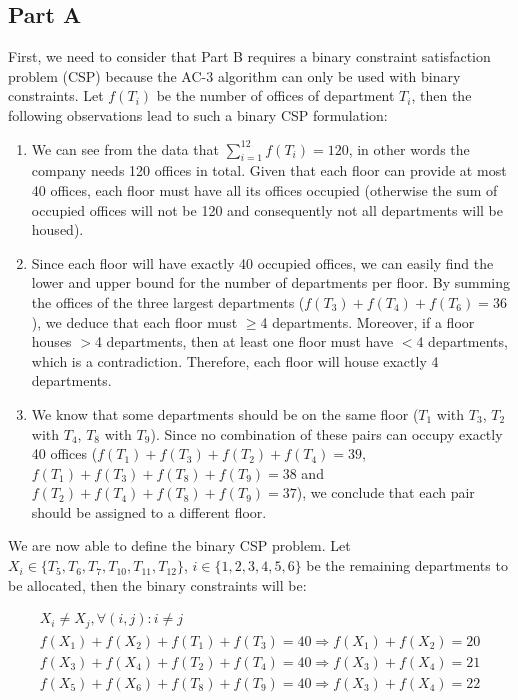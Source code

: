 \subsection*{Part A}

First, we need to consider that Part B requires a binary constraint satisfaction problem (CSP) because the AC-3 algorithm can only be used with binary constraints. Let $f(T_i)$ be the number of offices of department $T_i$, then the following observations lead to such a binary CSP formulation:

\begin{enumerate}

\item We can see from the data that $\sum_{i=1}^{12} f(T_i)=120$, in other words the company needs 120 offices in total. Given that each floor can provide at most 40 offices, each floor must have all its offices occupied (otherwise the sum of occupied offices will not be 120 and consequently not all departments will be housed).

\item Since each floor will have exactly 40 occupied offices, we can easily find the lower and upper bound for the number of departments per floor. By summing the offices of the three largest departments ($f(T_3)+f(T_4)+f(T_6)=36$), we deduce that each floor must $\ge$4 departments. Moreover, if a floor houses $>$4 departments, then at least one floor must have $<$4 departments, which is a contradiction. Therefore, each floor will house exactly 4 departments.

\item We know that some departments should be on the same floor ($T_1$ with $T_3$, $T_2$ with $T_4$, $T_8$ with $T_9$). Since no combination of these pairs can occupy exactly 40 offices ($f(T_1)+f(T_3)+f(T_2)+f(T_4) = 39$, $f(T_1)+f(T_3)+f(T_8)+f(T_9) = 38$ and $f(T_2)+f(T_4)+f(T_8)+f(T_9) = 37$), we conclude that each pair should be assigned to a different floor.

\end{enumerate}

We are now able to define the binary CSP problem. Let $X_i \in \{T_5, T_6, T_7, T_{10}, T_{11}, T_{12}\}$, $i \in \{1, 2, 3, 4, 5, 6\}$ be the remaining departments to be allocated, then the binary constraints will be:

\[
	\begin{array}{ll}
		X_i \ne X_j, \forall (i,j) : i \ne j \\
		f(X_1) + f(X_2) + f(T_1) + f(T_3) = 40 \Rightarrow f(X_1) + f(X_2) = 20 \\
		f(X_3) + f(X_4) + f(T_2) + f(T_4) = 40 \Rightarrow f(X_3) + f(X_4) = 21 \\
		f(X_5) + f(X_6) + f(T_8) + f(T_9) = 40 \Rightarrow f(X_3) + f(X_4) = 22
	\end{array}
\]

